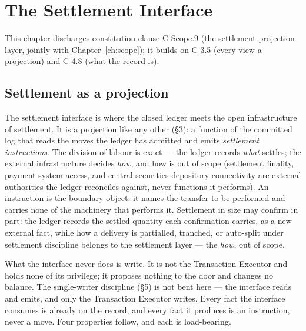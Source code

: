 
\section{The Settlement Interface}\label{ch:settlement}

This chapter discharges constitution clause C-Scope.9 (the settlement-projection layer, jointly with Chapter~\ref{ch:scope}); it builds on C-3.5 (every view a projection) and C-4.8 (what the record is).

\subsection{Settlement as a projection}

The settlement interface is where the closed ledger meets the open infrastructure
of settlement. It is a projection like any other (\S3): a function of the committed
log that reads the moves the ledger has admitted and emits \emph{settlement
instructions}. The division of labour is exact --- the ledger records \emph{what}
settles; the external infrastructure decides \emph{how}, and how is out of scope
(settlement finality, payment-system access, and central-securities-depository
connectivity are external authorities the ledger reconciles against, never
functions it performs). An instruction is the boundary object: it names the
transfer to be performed and carries none of the machinery that performs it.
Settlement in size may confirm in part: the ledger records the settled quantity each
confirmation carries, as a new external fact, while how a delivery is partialled,
tranched, or auto-split under settlement discipline belongs to the settlement layer ---
the \emph{how}, out of scope.

What the interface never does is write. It is not the Transaction Executor and
holds none of its privilege; it proposes nothing to the door and changes no
balance. The single-writer discipline (\S5) is not bent here --- the interface
reads and emits, and only the Transaction Executor writes. Every fact the interface
consumes is already on the record, and every fact it produces is an instruction,
never a move. Four properties follow, and each is load-bearing.

